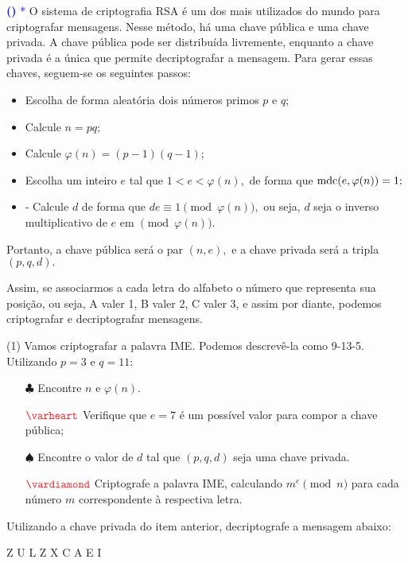 \documentclass[12pt, a4paper]{article}
\newcommand{\mdc}{{\rm mdc}}
\newcommand{\negrito}[1]{\mbox{\boldmath{$#1$}}}
\newcounter{exercicio}[section]
\newenvironment{exercicio}[1][]{\refstepcounter{exercicio}\par\medskip
 \textcolor{blue}{\bf(\theexercicio)} \rmfamily}{\medskip }
\newcommand{\itens}[1]{\begin{tasks}[label={(tsk[a])},label-width=3.6ex, label-format = {\bfseries}, column-sep = {0pt}](1) #1\end{tasks}}
\newcommand{\alt}[1]{\textcolor{Floresta}{$\negrito{(#1)} $}}
\begin{document}
\begin{exercicio}\textcolor{Blue}{*}
O sistema de criptografia RSA é um dos mais utilizados do mundo para criptografar mensagens. Nesse método, há uma chave pública e uma chave privada. A chave pública pode ser distribuída livremente, enquanto a chave privada é a única que permite decriptografar a mensagem. Para gerar essas chaves, seguem-se os seguintes passos:
\begin{itemize}
    \item Escolha de forma aleatória dois números primos $p$ e $q$;
    \item Calcule $n = pq;$
    \item Calcule $\varphi(n) = (p-1)(q-1);$
    \item  Escolha um inteiro $e$ tal que $1 < e < \varphi(n),$ de forma que $\mdc(e, \varphi(n)) = 1;$
    \item - Calcule $d$ de forma que $de \equiv 1 \pmod{\varphi(n)},$ ou seja, $d$ seja o inverso multiplicativo de $e$ em $\pmod{\varphi(n)}.$
\end{itemize}
Portanto, a chave pública será o par $(n, e),$ e a chave privada será a tripla $(p, q,d).$ 

Assim, se associarmos a cada letra do alfabeto o número que representa sua posição, ou seja, A valer 1, B valer 2, C valer 3, e assim por diante, podemos criptografar e decriptografar mensagens. 
\itens{
\task[\alt{a}] Vamos criptografar a palavra IME. Podemos descrevê-la como 9-13-5. Utilizando $p = 3$ e $q = 11:$ 
\begin{itemize} 
\item[$\clubsuit$] Encontre $n$ e $\varphi(n).$
\item[$\textcolor{Red}{\varheart}$] Verifique que $e = 7$ é um possível valor para compor a chave pública;
\item[$\spadesuit$] Encontre o valor de $d$ tal que $(p,q,d)$ seja uma chave privada.
\item[$\textcolor{Red}{\vardiamond}$] Criptografe a palavra IME, calculando $m^e \pmod{n}$ para cada número $m$ correspondente à respectiva letra. 
\end{itemize}
\task[\alt{b}] Utilizando a chave privada do item anterior, decriptografe a mensagem abaixo:
\begin{center}
Z U L Z X C A E I
\end{center}


}
\end{exercicio}
\end{document}
